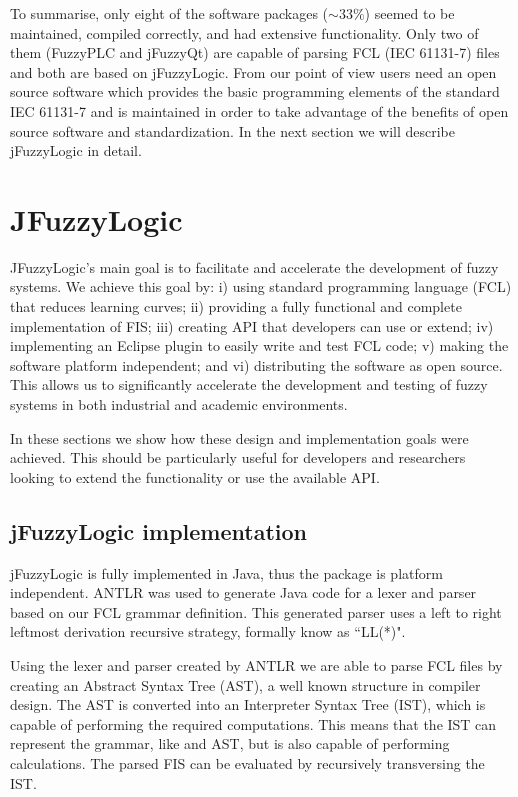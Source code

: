 \documentclass[11pt,twoside]{article}
\begin{document}
\begin{multicols}{2}
\begin{itemize}
\end{itemize}
To summarise, only eight of the software packages ($\sim 33\%$) seemed to be maintained, compiled correctly, and had extensive functionality.  Only two of them (FuzzyPLC and jFuzzyQt) are capable of parsing FCL (IEC 61131-7) files and both are based on jFuzzyLogic. From our point of view users need an open source software which provides the basic programming elements of the standard IEC 61131-7 and is maintained in order to take advantage of the benefits of open source software and standardization. In the next section
we will describe jFuzzyLogic in detail.


\section{JFuzzyLogic \label{sec:jFu}}

JFuzzyLogic's  main goal is to facilitate and accelerate the development of fuzzy systems. We achieve this goal by: i) using standard programming language (FCL) that reduces learning curves; ii) providing a fully functional and complete implementation of FIS; iii) creating API that developers can use or extend; iv) implementing an Eclipse plugin to easily write and test FCL code; v) making the software platform independent; and vi) distributing the software as open source. This allows us to significantly accelerate the development and testing of fuzzy systems in both industrial and academic environments.

In these sections we show how these design and implementation goals were achieved. This should be particularly useful for developers and researchers looking to extend the functionality or use the available API.


\subsection{jFuzzyLogic implementation \label{sec:implement}}

jFuzzyLogic is fully implemented in Java, thus the package is platform independent. ANTLR\cite{parr2007definitive} was used to generate Java code for a lexer and parser based on our FCL grammar definition. This generated parser uses a left to right leftmost derivation recursive strategy, formally know as ``LL(*)".

Using the lexer and parser created by ANTLR we are able to parse FCL files by creating an Abstract Syntax Tree (AST), a well known structure in compiler design. The AST is converted into an Interpreter Syntax Tree (IST), which is capable of performing the required computations. This means that the IST can represent the grammar, like and AST, but is also capable of performing calculations. The parsed FIS can be evaluated by recursively transversing the IST.



\end{multicols}
\end{document}

